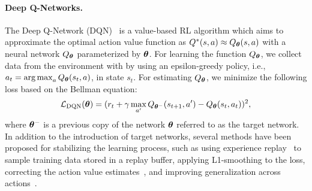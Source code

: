 \vspace{-3mm}
\paragraph{Deep Q-Networks.} The Deep Q-Network (DQN)~\cite{mnih2013playing, mnih2015human} is a value-based RL algorithm which aims to approximate the optimal action value function as $Q^{*}(s, a) \approx Q_{{\bm{\theta}}}(s, a)$ with a neural network $Q_{{\bm{\theta}}}$ parameterized by ${\bm{\theta}}$. For learning the function $Q_{{\bm{\theta}}}$, we collect data from the environment with by using an epsilon-greedy policy, i.e., $a_t = \operatorname*{arg\,max}_a Q_{{\bm{\theta}}}(s_t, a)$, in state $s_t$. For estimating $Q_{{\bm{\theta}}}$, we minimize the following loss based on the Bellman equation:
\begin{align}
	{\mathcal{L}}_{\text{DQN}}({\bm{\theta}}) = (r_t + \gamma \max_{a'} Q_{{\bm{\theta}}^{-}}(s_{t+1}, a') - Q_{{\bm{\theta}}}(s_t, a_t))^2 , 
\end{align}
where ${\bm{\theta}}^{-}$ is a previous copy of the network ${\bm{\theta}}$ referred to as the target network. In addition to the introduction of target networks, several methods have been proposed for stabilizing the learning process, such as using experience replay~\cite{lin1992self} to sample training data stored in a replay buffer, applying L1-smoothing to the loss, correcting the action value estimates~\cite{van2016deep}, and improving generalization across actions~\cite{wang2016dueling}. 

\vspace{-3mm}
